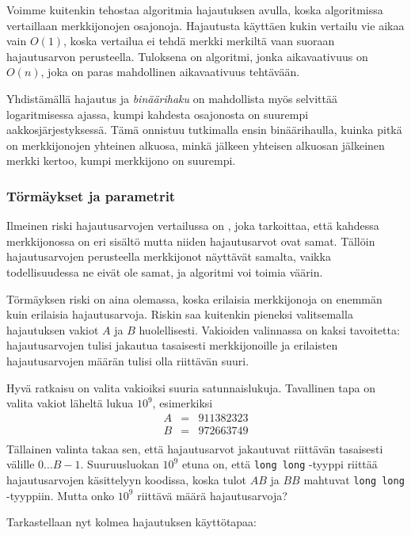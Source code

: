 Voimme kuitenkin tehostaa algoritmia hajautuksen avulla,
koska algoritmissa vertaillaan merkkijonojen osajonoja.
Hajautusta käyttäen kukin vertailu vie aikaa vain $O(1)$,
koska vertailua ei tehdä merkki merkiltä
vaan suoraan hajautusarvon perusteella.
Tuloksena on algoritmi, jonka aikavaativuus on $O(n)$,
joka on paras mahdollinen aikavaativuus tehtävään.

Yhdistämällä hajautus ja \emph{binäärihaku} on mahdollista
myös selvittää logaritmisessa ajassa,
kumpi kahdesta osajonosta on suurempi
aakkosjärjestyksessä.
Tämä onnistuu tutkimalla ensin binäärihaulla,
kuinka pitkä on merkkijonojen yhteinen alkuosa,
minkä jälkeen yhteisen alkuosan jälkeinen merkki
kertoo, kumpi merkkijono on suurempi.

\subsubsection*{Törmäykset ja parametrit}


Ilmeinen riski hajautusarvojen vertailussa
on , joka tarkoittaa, että kahdessa merkkijonossa on
eri sisältö mutta niiden hajautusarvot ovat samat.
Tällöin hajautusarvojen perusteella merkkijonot
näyttävät samalta, vaikka todellisuudessa ne eivät ole samat,
ja algoritmi voi toimia väärin.

Törmäyksen riski on aina olemassa,
koska erilaisia merkkijonoja on enemmän kuin
erilaisia hajautusarvoja.
Riskin saa kuitenkin pieneksi valitsemalla
hajautuksen vakiot $A$ ja $B$ huolellisesti.
Vakioiden valinnassa on kaksi tavoitetta:
hajautusarvojen tulisi
jakautua tasaisesti merkkijonoille
ja
erilaisten hajautusarvojen määrän tulisi
olla riittävän suuri.

Hyvä ratkaisu on valita vakioiksi suuria
satunnaislukuja. Tavallinen tapa on valita vakiot
läheltä lukua $10^9$, esimerkiksi
\[
\begin{array}{lcl}
A & = & 911382323 \\
B & = & 972663749 \\
\end{array}
\]
Tällainen valinta takaa sen,
että hajautusarvot jakautuvat
riittävän tasaisesti välille $0 \ldots B-1$.
Suuruusluokan $10^9$ etuna on,
että \texttt{long long} -tyyppi riittää
hajautusarvojen käsittelyyn koodissa,
koska tulot $AB$ ja $BB$ mahtuvat \texttt{long long} -tyyppiin.
Mutta onko $10^9$ riittävä määrä hajautusarvoja?

Tarkastellaan nyt kolmea hajautuksen käyttötapaa:

